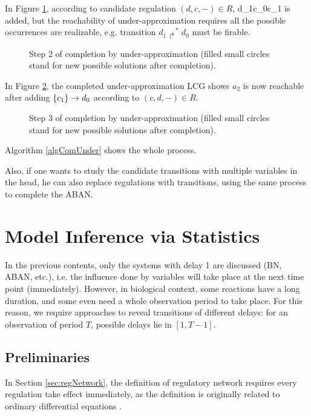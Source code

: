 In Figure \ref{Under2}, according to candidate regulation ${(d,c,-)}\in R$, \ac{d_1}{c_0}{c_1} is added, but the reachability of under-approximation requires all the possible occurrences are realizable, e.g. transition $d_1\Rsh^*d_0$ must be firable.

\begin{figure}[ht]
\centering

\caption[Operations on LCG(2)]{Step 2 of completion by under-approximation (filled small circles stand for new possible solutions after completion).}\label{Under2}
\end{figure}

In Figure \ref{Under3}, the completed under-approximation LCG shows $a_2$ is now reachable after adding $\acm{c_1}{d_1}{d_0}$ according to ${(c,d,-)}\in R$.

\begin{figure}[ht]
\centering

\caption[Operations on LCG(3)]{Step 3 of completion by under-approximation (filled small circles stand for new possible solutions after completion).}\label{Under3}
\end{figure}

Algorithm \ref{algComUnder} shows the whole process.

Also, if one wants to study the candidate transitions with multiple variables in the head, he can also replace regulations with transitions, using the same process to complete the ABAN. 

\section{Model Inference via Statistics}

In the previous contents, only the systems with delay 1 are discussed (BN, ABAN, etc.), i.e. the influence done by variables will take place at the next time point (immediately).
However, in biological context, some reactions have a long duration, and some even need a whole observation period to take place.
For this reason, we require approaches to reveal transitions of different delays: for an observation of period $T$, possible delays lie in $[1,T-1]$.

\subsection{Preliminaries}
In Section \ref{sec:regNetwork}, the definition of regulatory network requires every regulation take effect immediately, as the definition is originally related to ordinary differential equations \cite{khalis2009smbionet}.

